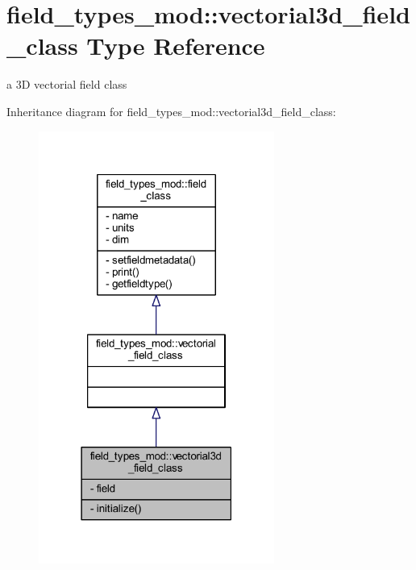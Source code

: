 \hypertarget{structfield__types__mod_1_1vectorial3d__field__class}{}\section{field\+\_\+types\+\_\+mod\+:\+:vectorial3d\+\_\+field\+\_\+class Type Reference}
\label{structfield__types__mod_1_1vectorial3d__field__class}


a 3D vectorial field class  




Inheritance diagram for field\+\_\+types\+\_\+mod\+:\+:vectorial3d\+\_\+field\+\_\+class\+:\nopagebreak
\begin{figure}[H]
\begin{center}
\leavevmode
\includegraphics[width=219pt]{structfield__types__mod_1_1vectorial3d__field__class__inherit__graph}
\end{center}
\end{figure}


